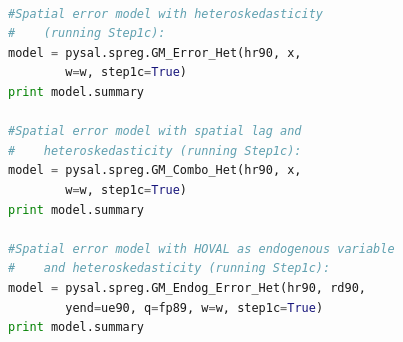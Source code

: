 \documentclass{article}
\begin{document}
\begin{code}
\begin{lstlisting}[label=lt:het_step1c,caption=Using PySAL to match the results of spatial error models with heteroskedasticity and endogenous variables or spatial lag from Stata,language=Python]

#Spatial error model with heteroskedasticity
#    (running Step1c):
model = pysal.spreg.GM_Error_Het(hr90, x,
        w=w, step1c=True)
print model.summary

#Spatial error model with spatial lag and
#    heteroskedasticity (running Step1c):
model = pysal.spreg.GM_Combo_Het(hr90, x,
        w=w, step1c=True)
print model.summary

#Spatial error model with HOVAL as endogenous variable
#    and heteroskedasticity (running Step1c):
model = pysal.spreg.GM_Endog_Error_Het(hr90, rd90,
        yend=ue90, q=fp89, w=w, step1c=True)
print model.summary

\end{lstlisting}
\end{code}


\newpage


\end{document}
